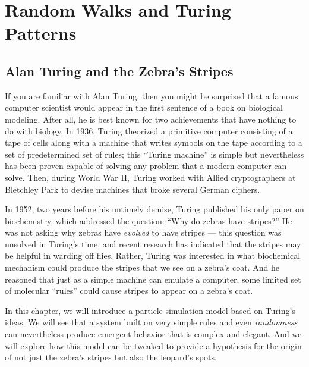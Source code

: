 \chapter[Random Walks and Turing Patterns]{Random Walks and Turing Patterns}
\label{chapter:turing}
\renewcommand{\chaptertitle}{Random Walks and Turing Patterns}

\FloatBarrier

\section{Alan Turing and the Zebra’s Stripes}
\label{sec:introduction}

If you are familiar with Alan Turing, then you might be surprised that a famous computer scientist would appear in the first sentence of a book on biological modeling. After all, he is best known for two achievements that have nothing to do with biology. In 1936, Turing theorized a primitive computer consisting of a tape of cells along with a machine that writes symbols on the tape according to a set of predetermined set of rules; this ``Turing machine'' is simple but nevertheless has been proven capable of solving any problem that a modern computer can solve.  Then, during World War II, Turing worked with Allied cryptographers at Bletchley Park to devise machines that broke several German ciphers.

In 1952, two years before his untimely demise, Turing published his only paper on biochemistry, which addressed the question: “Why do zebras have stripes?” He was not asking why zebras have \textit{evolved} to have stripes --- this question was unsolved in Turing's time, and recent research has indicated that the stripes may be helpful in warding off flies. Rather, Turing was interested in what biochemical mechanism could produce the stripes that we see on a zebra's coat. And he reasoned that just as a simple machine can emulate a computer, some limited set of molecular ``rules'' could cause stripes to appear on a zebra's coat.

In this chapter, we will introduce a particle simulation model based on Turing's ideas. We will see that a system built on very simple rules and even \textit{randomness} can nevertheless produce emergent behavior that is complex and elegant. And we will explore how this model can be tweaked to provide a hypothesis for the origin of not just the zebra's stripes but also the leopard's spots.\\

